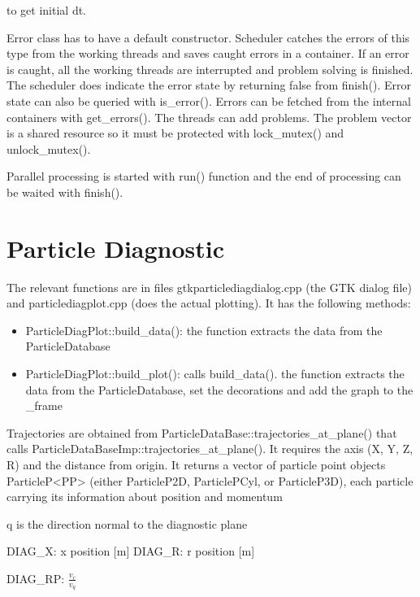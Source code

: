 \documentclass[12pt,a4paper]{article}
\begin{document}
to get initial dt.






Error class has to have a default constructor. Scheduler catches
the errors of this type from the working threads and saves caught
errors in a container. If an error is caught, all the working
threads are interrupted and problem solving is finished. The
scheduler does indicate the error state by returning false from
finish(). Error state can also be queried with is_error(). Errors
can be fetched from the internal containers with get_errors().
The %
threads can add problems. The problem vector is a shared resource
so it must be protected with lock_mutex() and unlock_mutex().

Parallel processing is started with run() function and the end of
processing can be waited with finish().




\section{Particle Diagnostic}

The relevant functions are in files gtkparticlediagdialog.cpp (the GTK dialog file) and particlediagplot.cpp (does the actual plotting). It has the following methods:

\begin{itemize}
	\item ParticleDiagPlot::build\_data(): the function extracts the data from the ParticleDatabase
	\item ParticleDiagPlot::build\_plot(): calls build\_data(). the function extracts the data from the ParticleDatabase, set the decorations and add the graph to the \_frame
\end{itemize}


Trajectories are obtained from ParticleDataBase::trajectories\_at\_plane() that calls ParticleDataBaseImp::trajectories\_at\_plane(). It requires the axis (X, Y, Z, R) and the distance from origin. It returns a vector of particle point objects ParticleP<PP> (either ParticleP2D, ParticlePCyl, or ParticleP3D), each particle carrying its information about position and momentum

q is the direction normal to the diagnostic plane

DIAG\_X: x position [m]
DIAG\_R: r position [m]



DIAG\_RP: $\frac{v_r}{v_q}$
\end{document}
